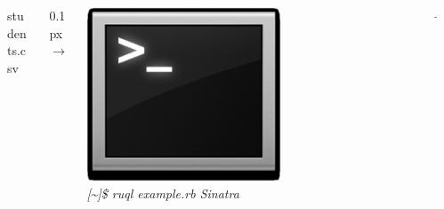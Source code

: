 \documentclass{beamer}
\begin{document}
\begin{frame}[allowframebreaks]
\begin{itemize}
\begin{columns}
\begin{column}{3.05cm}
        \hspace*{0.3cm}
        students.csv
      \end{column}
      \begin{column}{0.1px}
        $\rightarrow$
      \end{column}
      \begin{column}{4cm}
        \hspace*{0.8cm}
        \begin{center}
          \includegraphics[width=0.6\textwidth]{img/terminal_icon.eps} \\
          \tiny{\textit{[\textasciitilde]\$ ruql example.rb Sinatra}}
        \end{center}
      \end{column}
      \begin{column}{0.5cm}
        $\rightarrow$
      \end{column}
      \begin{column}{4cm}
        \begin{center}

\end{center}
\end{column}
\end{columns}
\end{itemize}
\end{frame}
\end{document}
